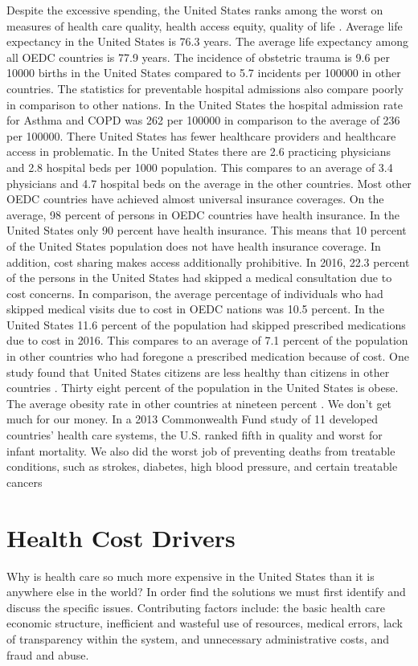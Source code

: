 \documentclass[sigconf]{acmart}
\begin{document}
Despite the excessive spending, the United States ranks among the worst on measures of health care quality, health access equity, quality of life \cite{www-google-McDonald}.  Average life expectancy in the United States is 76.3 years.  The average life expectancy among all OEDC countries is 77.9 years. The incidence of obstetric trauma is 9.6 per 10000 births in the United States compared to 5.7 incidents per 100000 in other countries. The statistics for preventable hospital admissions also compare poorly in comparison to other nations. In the United States the hospital admission rate for Asthma and COPD was 262 per 100000 in comparison to the average of 236 per 100000.  There United States has fewer healthcare providers and healthcare access in problematic.  In the United States there are 2.6 practicing physicians and 2.8 hospital beds per 1000 population. This compares to an average of 3.4 physicians and 4.7 hospital beds on the average in the other countries. Most other OEDC countries have achieved almost universal insurance coverages. On the average, 98 percent of persons in OEDC countries have health insurance. In the United States only 90 percent have health insurance. This means that 10 percent of the United States population does not have health insurance coverage. In addition, cost sharing makes access additionally prohibitive.  In 2016, 22.3 percent of the persons in the United States had skipped a medical consultation due to cost concerns. In comparison, the average percentage of individuals who had skipped medical visits due to cost in OEDC nations was 10.5 percent.  In the United States 11.6 percent of the population had skipped prescribed medications due to cost in 2016. This compares to an average of 7.1 percent of the population in other countries who had foregone a prescribed medication because of cost. One study found that United States citizens are less healthy than citizens in other countries \cite{milbank}.  Thirty eight percent of the population in the United States is obese. The average obesity rate in other countries at nineteen percent \cite{www-google-OEDC}. We don’t get much for our money. In a 2013 Commonwealth Fund study of 11 developed countries’ health care systems, the U.S. ranked fifth in quality and worst for infant mortality. We also did the worst job of preventing deaths from treatable conditions, such as strokes, diabetes, high blood pressure, and certain treatable cancers

\section{Health Cost Drivers}
Why is health care so much more expensive in the United States than it is anywhere else in the world?   In order find the solutions we must first identify and discuss the specific issues. Contributing factors include: the basic health care economic structure, inefficient and wasteful use of resources, medical errors, lack of transparency within the system, and unnecessary administrative costs, and fraud and abuse.
\end{document}
